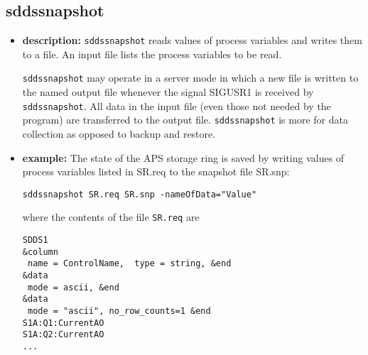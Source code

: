 %
%
\begin{latexonly}
\newpage
\end{latexonly}

%
%
\subsection{sddssnapshot}
\label{sddssnapshot}

\begin{itemize}
\item {\bf description:}
%
%
\verb+sddssnapshot+ reads values of process variables and writes them to a file.
An input file lists the process variables to be read.

\verb+sddssnapshot+ may operate in a server mode in which a new file is written to the named output file whenever the signal SIGUSR1 is received
by \verb+sddssnapshot+.
All data in the input file (even those not needed by the program) are transferred to the output file.
\verb+sddssnapshot+ is more for data collection as opposed to backup and restore.

\item {\bf example:} 
%
% 
%
The state of the APS storage ring is saved by writing 
values of process variables listed in SR.req
to the snapshot file SR.snp:
\begin{verbatim}
sddssnapshot SR.req SR.snp -nameOfData="Value"
\end{verbatim}
where the contents of the file \verb+SR.req+ are
\begin{verbatim}
SDDS1
&column
 name = ControlName,  type = string, &end
&data
 mode = ascii, &end
&data
 mode = "ascii", no_row_counts=1 &end
S1A:Q1:CurrentAO
S1A:Q2:CurrentAO
...
\end{verbatim}


\end{itemize}
